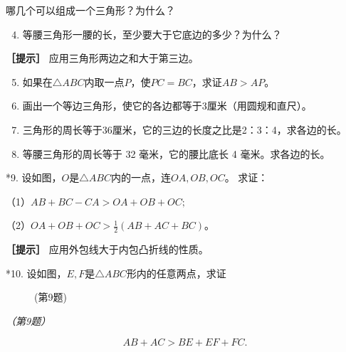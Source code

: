 哪几个可以组成一个三角形？为什么？

\begin{enumerate}
\setcounter{enumi}{3}
\item
  等腰三角形一腰的长，至少要大于它底边的多少？为什么？
\end{enumerate}

\textbf{［提示］} 应用三角形两边之和大于第三边。

\begin{enumerate}
\setcounter{enumi}{4}
\item
  如果在\(\triangle ABC\)内取一点\(P\)，使\(PC = BC\)，求证\(AB > AP\)。
\item
  画出一个等边三角形，使它的各边都等于3厘米（用圆规和直尺）。
\item
  三角形的周长等于36厘米，它的三边的长度之比是2：3：4，求各边的长。
\item
  等腰三角形的周长等于 32 毫米，它的腰比底长 4 毫米。求各边的长。
\end{enumerate}

*9. 设如图，\(O\)是\(\triangle ABC\)内的一点，连\(OA, OB, OC\)。 求证：

（1）\(AB + BC - CA > OA + OB + OC;\)

（2）\(OA + OB + OC > \frac{1}{2} (AB + AC + BC)\)。

\textbf{［提示］} 应用外包线大于内包凸折线的性质。

*10. 设如图，\(E, F\)是\(\triangle ABC\)形内的任意两点，求证

\begin{figure}
\centering
{}
\caption{(第9题)}
\end{figure}

\emph{（第9题）}

\[
AB + AC > BE + EF + FC.
\]

